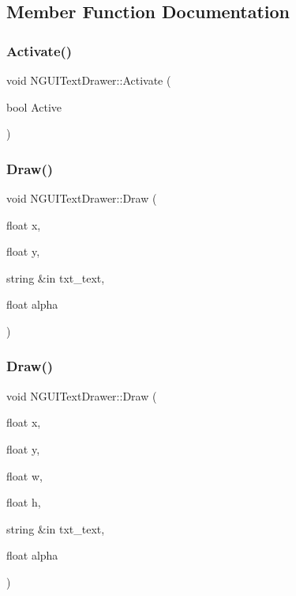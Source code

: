 

\subsection{Member Function Documentation}
\hypertarget{class_n_g_u_i_text_drawer_a03c4b039baeef77accfb60a7d976f58b}{}\label{class_n_g_u_i_text_drawer_a03c4b039baeef77accfb60a7d976f58b} 
\subsubsection{\texorpdfstring{Activate()}{Activate()}}
{\footnotesize\ttfamily void N\+G\+U\+I\+Text\+Drawer\+::\+Activate (\begin{DoxyParamCaption}\item[{bool}]{Active }\end{DoxyParamCaption})}

\hypertarget{class_n_g_u_i_text_drawer_a80e71bee6be505b844d9d7d09122e7b1}{}\label{class_n_g_u_i_text_drawer_a80e71bee6be505b844d9d7d09122e7b1} 
\subsubsection{\texorpdfstring{Draw()}{Draw()}\hspace{0.1cm}{\footnotesize\ttfamily [1/3]}}
{\footnotesize\ttfamily void N\+G\+U\+I\+Text\+Drawer\+::\+Draw (\begin{DoxyParamCaption}\item[{float}]{x,  }\item[{float}]{y,  }\item[{string \&in}]{txt\+\_\+text,  }\item[{float}]{alpha }\end{DoxyParamCaption})}

\hypertarget{class_n_g_u_i_text_drawer_a68f31eafb3765118a202066223df177b}{}\label{class_n_g_u_i_text_drawer_a68f31eafb3765118a202066223df177b} 
\subsubsection{\texorpdfstring{Draw()}{Draw()}\hspace{0.1cm}{\footnotesize\ttfamily [2/3]}}
{\footnotesize\ttfamily void N\+G\+U\+I\+Text\+Drawer\+::\+Draw (\begin{DoxyParamCaption}\item[{float}]{x,  }\item[{float}]{y,  }\item[{float}]{w,  }\item[{float}]{h,  }\item[{string \&in}]{txt\+\_\+text,  }\item[{float}]{alpha }\end{DoxyParamCaption})}

